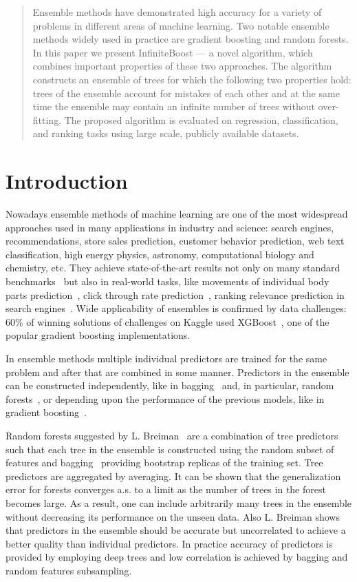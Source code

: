 \begin{abstract}
    Ensemble methods have demonstrated high accuracy for a variety of problems in different areas of machine learning.
    Two notable ensemble methods widely used in practice are gradient boosting and random forests.
    In this paper we present InfiniteBoost --- a novel algorithm, which combines important properties of these two approaches. 
    The algorithm constructs an ensemble of trees for which the following two properties hold: 
    trees of the ensemble account for mistakes of each other and at the same time the ensemble may contain an infinite number of trees without over-fitting.
    The proposed algorithm is evaluated on regression, classification, and ranking tasks using large scale, publicly available datasets.
\end{abstract}

\section{Introduction}

Nowadays ensemble methods of machine learning are one of the most widespread approaches used in many applications in industry and science:
search engines, recommendations, store sales prediction, customer behavior prediction, web text classification, high energy physics, astronomy, computational biology and chemistry, etc.
They achieve state-of-the-art results not only on many standard benchmarks~\cite{key-benchmarks,key-benchmarks-forest} but also in real-world tasks, like movements of individual body parts prediction~\cite{key-kinect}, click through rate prediction~\cite{key-facebook}, ranking relevance prediction in search engines~\cite{key-yahoo}. 
Wide applicability of ensembles is confirmed by data challenges: 60\% of winning solutions of challenges on Kaggle used XGBoost~\cite{key-xgboost}, one of the popular gradient boosting implementations. 

In ensemble methods multiple individual predictors are trained for the same problem and after that are combined in some manner.
Predictors in the ensemble can be constructed independently, like in bagging~\cite{key-bagging} and, in particular, random forests~\cite{key-random-forest}, or depending upon the performance of the previous models, like in gradient boosting~\cite{key-gb}.

Random forests suggested by L. Breiman~\cite{key-random-forest} are a combination of tree predictors such that each tree in the ensemble is constructed using the random subset of features and bagging~\cite{key-bagging} providing bootstrap replicas of the training set.
Tree predictors are aggregated by averaging.
It can be shown that the generalization error for forests converges a.s. to a limit as the number of trees in the forest becomes large.
As a result, one can include arbitrarily many trees in the ensemble without decreasing its performance on the unseen data.
Also L. Breiman shows that predictors in the ensemble should be accurate but uncorrelated to achieve a better quality than individual predictors. 
In practice accuracy of predictors is provided by employing deep trees and low correlation is achieved by bagging and random features subsampling.

